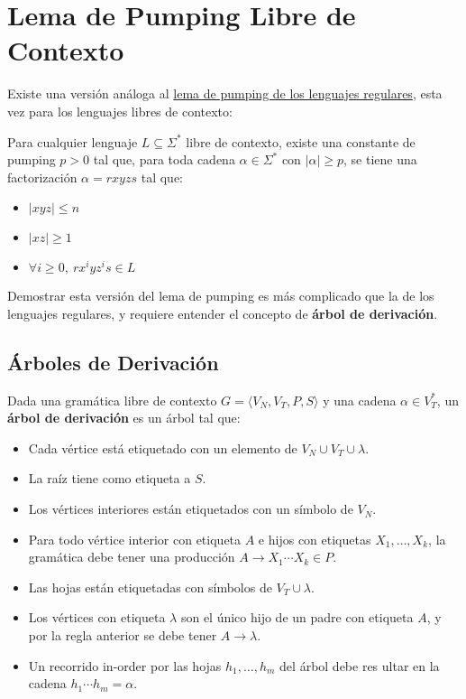 \section{Lema de Pumping Libre de Contexto}

Existe una versión análoga al \hyperref[pumping-regulares]{lema de pumping de los lenguajes regulares}, esta vez para los lenguajes libres de contexto:

\begin{theorem*}
    Para cualquier lenguaje $L \subseteq \Sigma^*$ libre de contexto, existe una constante de pumping $p > 0$ tal que, para toda cadena $\alpha \in \Sigma^*$ con $|\alpha| \geq p$, se tiene una factorización $\alpha = r x y z s$ tal que:
    \begin{itemize}
        \item $|xyz| \leq n$
        \item $|xz| \geq 1$
        \item $\forall i \geq 0,\ r x^i y z^i s \in L$
    \end{itemize}
\end{theorem*}

Demostrar esta versión del lema de pumping es más complicado que la de los lenguajes regulares, y requiere entender el concepto de \textbf{árbol de derivación}.

\subsection{Árboles de Derivación}

Dada una gramática libre de contexto $G = \langle V_N, V_T, P, S \rangle$ y una cadena $\alpha \in V_T^*$, un \textbf{árbol de derivación} es un árbol tal que:
\begin{itemize}
    \item Cada vértice está etiquetado con un elemento de $V_N \cup V_T \cup \lambda$.
    \item La raíz tiene como etiqueta a $S$.
    \item Los vértices interiores están etiquetados con un símbolo de $V_N$.
    \item Para todo vértice interior con etiqueta $A$ e hijos con etiquetas $X_1, \dots, X_k$, la gramática debe tener una producción $A \to X_1 \cdots X_k \in P$.
    \item Las hojas están etiquetadas con símbolos de $V_T \cup \lambda$.
    \item Los vértices con etiqueta $\lambda$ son el único hijo de un padre con etiqueta $A$, y por la regla anterior se debe tener $A \to \lambda$.
    \item Un recorrido in-order por las hojas $h_1, \dots, h_m$ del árbol debe res ultar en la cadena $h_1 \cdots h_m = \alpha$.
\end{itemize}

